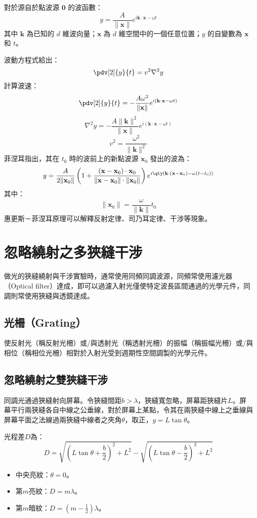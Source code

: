 \documentclass[a4paper,12pt]{report}
\begin{document}
對於源自於點波源 $\mathbf{0}$ 的波函數：
\[y=\frac{A}{\|\mathbf{x}\|}e^{i\mathbf{k}\cdot\mathbf{x}-\omega t}\]
其中 $\mathbf{k}$ 為已知的 $d$ 維波向量；$\mathbf{x}$ 為 $d$ 維空間中的一個任意位置；$y$ 的自變數為 $\mathbf{x}$ 和 $t$。

波動方程式給出：
\[ \pdv[2]{y}{t} = v^2\nabla^2y \]
計算波速：
\[\pdv[2]{y}{t} = -\frac{A \omega^2}{\|\mathbf{x}\|} e^{i (\mathbf{k} \cdot \mathbf{x} - \omega t)}\]
\[\nabla^2 y = -\frac{A \|\mathbf{k}\|^2}{\|\mathbf{x}\|} e^{i (\mathbf{k} \cdot \mathbf{x} - \omega t)}\]
\[v^2 = \frac{\omega^2}{\|\mathbf{k}\|^2}\]
菲涅耳指出，其在 $t_0$ 時的波前上的新點波源 $\mathbf{x}_0$ 發出的波為：
\[y=\frac{A}{2\|\mathbf{x}_0\|}\left(1+\frac{\left(\mathbf{x}-\mathbf{x}_0\right)\cdot\mathbf{x}_0}{\|\mathbf{x}-\mathbf{x}_0\|\cdot\|\mathbf{x}_0\|}\right)e^{i\qty(\mathbf{k}\cdot\left(\mathbf{x}-\mathbf{x}_0\right)-\omega \left(t-t_0\right))}\]
其中：
\[\|\mathbf{x}_0\|=\frac{\omega}{\|\mathbf{k}\|}t_0\]
惠更斯－菲涅耳原理可以解釋反射定律、司乃耳定律、干涉等現象。


\section{忽略繞射之多狹縫干涉}
做光的狹縫繞射與干涉實驗時，通常使用同頻同調波源，同頻常使用濾光器（Optical filter）達成，即可以過濾入射光僅使特定波長區間通過的光學元件，同調則常使用狹縫與透鏡達成。
\subsection{光柵（Grating）}
使反射光（稱反射光柵）或/與透射光（稱透射光柵）的振幅（稱振幅光柵）或/與相位（稱相位光柵）相對於入射光受到週期性空間調製的光學元件。
\subsection{忽略繞射之雙狹縫干涉}
同調光通過狹縫射向屏幕。令狹縫間距$b>\lambda$，狹縫寬忽略，屏幕距狹縫片$L$。屏幕平行兩狹縫各自中線之公垂線，對於屏幕上某點，令其在兩狹縫中線上之垂線與屏幕平面之法線過兩狹縫中線者之夾角$\theta$，取正，$y=L\tan\theta$。

光程差$D$為：
\[D=\sqrt{\left(L\tan\theta+\frac{b}{2}\right)^2+L^2}-\sqrt{\left(L\tan\theta-\frac{b}{2}\right)^2+L^2}\]
\begin{itemize}
\item 中央亮紋：$\theta=0$。
\item 第$m$亮紋：$D=m\lambda$。
\item 第$m$暗紋：$D=\left(m-\frac{1}{2}\right)\lambda$。
\end{itemize}
\end{document}
